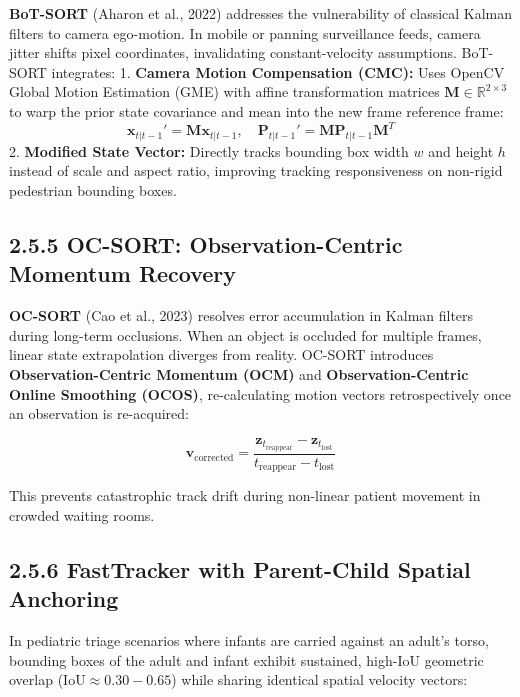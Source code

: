 \textbf{BoT-SORT} (Aharon et al., 2022) addresses the vulnerability of
classical Kalman filters to camera ego-motion. In mobile or panning
surveillance feeds, camera jitter shifts pixel coordinates, invalidating
constant-velocity assumptions. BoT-SORT integrates: 1. \textbf{Camera
Motion Compensation (CMC):} Uses OpenCV Global Motion Estimation (GME)
with affine transformation matrices
\(\mathbf{M} \in \mathbb{R}^{2 \times 3}\) to warp the prior state
covariance and mean into the new frame reference frame:
\[\mathbf{x}_{t|t-1}' = \mathbf{M} \mathbf{x}_{t|t-1}, \quad \mathbf{P}_{t|t-1}' = \mathbf{M} \mathbf{P}_{t|t-1} \mathbf{M}^T\]
2. \textbf{Modified State Vector:} Directly tracks bounding box width
\(w\) and height \(h\) instead of scale and aspect ratio, improving
tracking responsiveness on non-rigid pedestrian bounding boxes.

\subsection{2.5.5 OC-SORT: Observation-Centric Momentum
Recovery}\label{oc-sort-observation-centric-momentum-recovery}

\textbf{OC-SORT} (Cao et al., 2023) resolves error accumulation in
Kalman filters during long-term occlusions. When an object is occluded
for multiple frames, linear state extrapolation diverges from reality.
OC-SORT introduces \textbf{Observation-Centric Momentum (OCM)} and
\textbf{Observation-Centric Online Smoothing (OCOS)}, re-calculating
motion vectors retrospectively once an observation is re-acquired:

\[\mathbf{v}_{\text{corrected}} = \frac{\mathbf{z}_{t_{\text{reappear}}} - \mathbf{z}_{t_{\text{lost}}}}{t_{\text{reappear}} - t_{\text{lost}}}\]

This prevents catastrophic track drift during non-linear patient
movement in crowded waiting rooms.

\subsection{2.5.6 FastTracker with Parent-Child Spatial
Anchoring}\label{fasttracker-with-parent-child-spatial-anchoring}

In pediatric triage scenarios where infants are carried against an
adult's torso, bounding boxes of the adult and infant exhibit sustained,
high-IoU geometric overlap (\(\text{IoU} \approx 0.30 - 0.65\)) while
sharing identical spatial velocity vectors:

